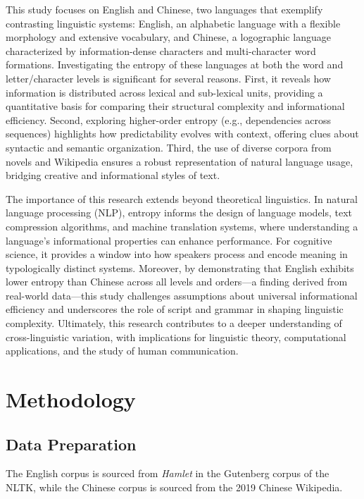 \documentclass[12pt]{article}
\begin{document}
This study focuses on English and Chinese, two languages that exemplify contrasting linguistic systems: English, an alphabetic language with a flexible morphology and extensive vocabulary, and Chinese, a logographic language characterized by information-dense characters and multi-character word formations. Investigating the entropy of these languages at both the word and letter/character levels is significant for several reasons. First, it reveals how information is distributed across lexical and sub-lexical units, providing a quantitative basis for comparing their structural complexity and informational efficiency. Second, exploring higher-order entropy (e.g., dependencies across sequences) highlights how predictability evolves with context, offering clues about syntactic and semantic organization. Third, the use of diverse corpora from novels and Wikipedia ensures a robust representation of natural language usage, bridging creative and informational styles of text.

The importance of this research extends beyond theoretical linguistics. In natural language processing (NLP), entropy informs the design of language models, text compression algorithms, and machine translation systems, where understanding a language’s informational properties can enhance performance. For cognitive science, it provides a window into how speakers process and encode meaning in typologically distinct systems. Moreover, by demonstrating that English exhibits lower entropy than Chinese across all levels and orders—a finding derived from real-world data—this study challenges assumptions about universal informational efficiency and underscores the role of script and grammar in shaping linguistic complexity. Ultimately, this research contributes to a deeper understanding of cross-linguistic variation, with implications for linguistic theory, computational applications, and the study of human communication.
\section*{\centering Methodology}

\subsection*{\centering Data Preparation}
The English corpus is sourced from \textit{Hamlet} in the Gutenberg corpus of the NLTK\cite{bird2006}, while the Chinese corpus is sourced from the 2019 Chinese Wikipedia.
\end{document}
